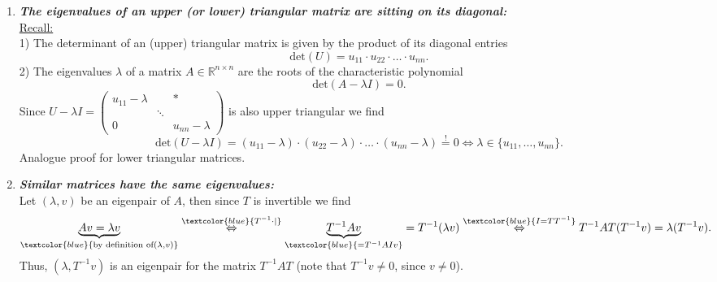 {\begin{enumerate}
	We know $Q^\top Q = I$.  Now let $(\lambda, v)$ be an eigenpair of $Q$, i.e., $Qv = \lambda v$. Using the notation from the previous subtask, i.e., letting $\overline{v}  = (\overline{v}_1,\ldots, \overline{v}_n)$ denote the complex conjugate of $v$, we find on the one hand that
	$$(Q \overline{v})^\top (Qv) = \overline{v}^\top Q^\top Q v = \overline{v}^\top v  \in \R.$$
 	On the other hand, since $Q$ is assumed to be real we find
		$$(Q \overline{v})^\top (Qv)=(\overline{Q v})^\top (Qv) =(\overline{ \lambda v})^\top ( \lambda v)  =\overline{ \lambda} \lambda  (\overline{v}^\top v ) = |\lambda |^2 (\overline{v}^\top v )\in \R.$$
    Thus combining these two equations gives
    $$|\lambda | = 1. $$
	\item \textbf{\textit{The eigenvalues of an upper (or lower) triangular matrix are sitting on its diagonal:}}\\ 
		\underline{Recall:} \\
1) The determinant of an (upper) triangular matrix is given by the product of its diagonal entries
$$
\text{det}(U)=u_{11}\cdot u_{22}\cdot\ldots\cdot u_{nn}.
$$
2) The eigenvalues $\lambda$ of a matrix $A\in\mathbb{R}^{n\times n}$ are the roots of the characteristic polynomial 
$$
\text{det}(A-\lambda I) = 0.
$$
Since $U-\lambda I = \begin{pmatrix}u_{11}-\lambda& &*\\ &\ddots& \\0& &u_{nn}-\lambda\end{pmatrix}$ is also upper triangular we find
$$
\text{det}(U-\lambda I)=(u_{11}-\lambda)\cdot(u_{22}-\lambda)\cdot\ldots\cdot(u_{nn}-\lambda)\stackrel{!}{=}0\Leftrightarrow \lambda\in\{u_{11},\dots,u_{nn}\}.
$$
Analogue proof for lower triangular matrices.
%
%
	\item \textbf{\textit{Similar matrices have the same eigenvalues:}}\\ 
		Let $(\lambda,v)$ be an eigenpair of $A$, then since $T$ is invertible we find
$$
\underbrace{Av=\lambda v}_{\textcolor{blue}{\text{by definition of} (\lambda,v)}}\stackrel{\textcolor{blue}{T^{-1}\cdot|}}{\Leftrightarrow} \underbrace{T^{-1}Av}_{\textcolor{blue}{=T^{-1}AIv}} = T^{-1}(\lambda v) \stackrel{\textcolor{blue}{I=TT^{-1}}}{\Leftrightarrow} T^{-1}AT(T^{-1}v) = \lambda(T^{-1}v).
$$
	Thus, $(\lambda, T^{-1}v)$ is an eigenpair for the matrix $T^{-1}AT$ (note that $T^{-1}v\neq 0$, since $v\neq 0$).\\~\\

\end{enumerate}}
